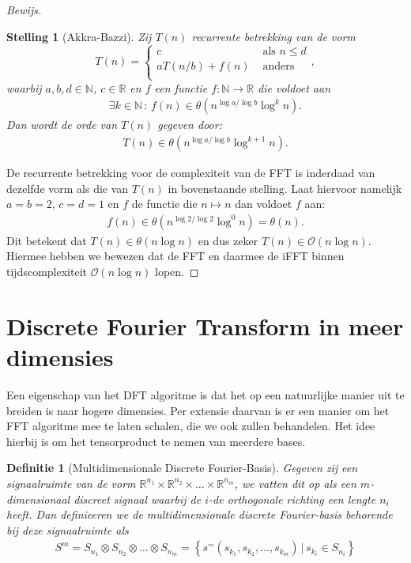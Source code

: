 \documentclass[11pt]{amsart}
\newcommand{\R}{\mathbb{R}}
\newcommand{\N}{\mathbb{N}}
\renewcommand{\O}{\mathcal{O}}
\newtheorem*{stelling}{Stelling}
\newtheorem*{definitie}{Definitie}
\theoremstyle{remark}
\newcommand{\eq}[1]{\begin{eqnarray*} #1 \end{eqnarray*}}
\newcommand{\largediv}{\,\big|\,}
\begin{document}
\begin{proof}[Bewijs]
\begin{stelling}[Akkra-Bazzi]
Zij $T(n)$ recurrente betrekking van de vorm
\[
T(n) = \begin{cases}
  c &\text{ als } n \leq d \\
  a T(n/b) + f(n) &\text{ anders} \\
\end{cases},
\]
waarbij $a,b,d\in\N$, $c\in\R$ en $f$ een functie $f:\N\rightarrow\R$ die voldoet aan 
\eq{
  \exists k \in \N \,:\, f(n) \in \theta(n^{\log a/\log b} \log^k n).
}
Dan wordt de orde van $T(n)$ gegeven door:
\eq{
  T(n) \in \theta(n^{\log a / \log b} \log^{k+1}n).
}
\end{stelling}

De recurrente betrekking voor de complexiteit van de FFT is inderdaad van dezelfde vorm als die van $T(n)$ in bovenstaande stelling.
Laat hiervoor namelijk $a=b=2$, $c=d=1$ en $f$ de functie die $n\mapsto n$ dan voldoet $f$ aan:
\eq{
  f(n) \in \theta(n^{\log 2/\log 2} \log^0 n)=\theta(n).
}
Dit betekent dat $T(n) \in \theta(n \log n)$ en dus zeker $T(n) \in \O(n \log n)$.
Hiermee hebben we bewezen dat de FFT en daarmee de iFFT binnen tijdscomplexiteit $\O(n\log n)$ lopen. 
\end{proof}

\section{Discrete Fourier Transform in meer dimensies}
Een eigenschap van het DFT algoritme is dat het op een natuurlijke manier uit te breiden is naar hogere dimensies.
Per extensie daarvan is er een manier om het FFT algoritme mee te laten schalen, die we ook zullen behandelen.
Het idee hierbij is om het tensorproduct te nemen van meerdere bases.

\begin{definitie}[Multidimensionale Discrete Fourier-Basis] 
Gegeven zij een signaalruimte van de vorm
$\R^{n_1} \times \R^{n_2} \times \ldots \times \R^{n_m}$, we vatten dit op als
een $m$-dimensionaal discreet signaal waarbij de $i$-de orthogonale richting een lengte $n_i$ heeft.
Dan definieeren we de multidimensionale discrete Fourier-basis behorende bij deze signaalruimte als
\eq{
  S^m = S_{n_1}\otimes S_{n_2} \otimes \ldots \otimes S_{n_m} = 
  \left\{s^ = (s_{k_1},s_{k_2},\ldots,s_{k_m}) \largediv s_{k_i} \in S_{n_i} \right\}
}

\end{definitie}
\end{document}
